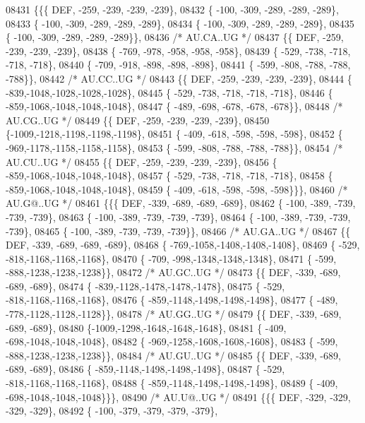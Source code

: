 \begin{DoxyCode}
08431 \{\{\{  DEF, -259, -239, -239, -239\},
08432 \{ -100, -309, -289, -289, -289\},
08433 \{ -100, -309, -289, -289, -289\},
08434 \{ -100, -309, -289, -289, -289\},
08435 \{ -100, -309, -289, -289, -289\}\},
08436 \textcolor{comment}{/* AU.CA..UG */}
08437 \{\{  DEF, -259, -239, -239, -239\},
08438 \{ -769, -978, -958, -958, -958\},
08439 \{ -529, -738, -718, -718, -718\},
08440 \{ -709, -918, -898, -898, -898\},
08441 \{ -599, -808, -788, -788, -788\}\},
08442 \textcolor{comment}{/* AU.CC..UG */}
08443 \{\{  DEF, -259, -239, -239, -239\},
08444 \{ -839,-1048,-1028,-1028,-1028\},
08445 \{ -529, -738, -718, -718, -718\},
08446 \{ -859,-1068,-1048,-1048,-1048\},
08447 \{ -489, -698, -678, -678, -678\}\},
08448 \textcolor{comment}{/* AU.CG..UG */}
08449 \{\{  DEF, -259, -239, -239, -239\},
08450 \{-1009,-1218,-1198,-1198,-1198\},
08451 \{ -409, -618, -598, -598, -598\},
08452 \{ -969,-1178,-1158,-1158,-1158\},
08453 \{ -599, -808, -788, -788, -788\}\},
08454 \textcolor{comment}{/* AU.CU..UG */}
08455 \{\{  DEF, -259, -239, -239, -239\},
08456 \{ -859,-1068,-1048,-1048,-1048\},
08457 \{ -529, -738, -718, -718, -718\},
08458 \{ -859,-1068,-1048,-1048,-1048\},
08459 \{ -409, -618, -598, -598, -598\}\}\},
08460 \textcolor{comment}{/* AU.G@..UG */}
08461 \{\{\{  DEF, -339, -689, -689, -689\},
08462 \{ -100, -389, -739, -739, -739\},
08463 \{ -100, -389, -739, -739, -739\},
08464 \{ -100, -389, -739, -739, -739\},
08465 \{ -100, -389, -739, -739, -739\}\},
08466 \textcolor{comment}{/* AU.GA..UG */}
08467 \{\{  DEF, -339, -689, -689, -689\},
08468 \{ -769,-1058,-1408,-1408,-1408\},
08469 \{ -529, -818,-1168,-1168,-1168\},
08470 \{ -709, -998,-1348,-1348,-1348\},
08471 \{ -599, -888,-1238,-1238,-1238\}\},
08472 \textcolor{comment}{/* AU.GC..UG */}
08473 \{\{  DEF, -339, -689, -689, -689\},
08474 \{ -839,-1128,-1478,-1478,-1478\},
08475 \{ -529, -818,-1168,-1168,-1168\},
08476 \{ -859,-1148,-1498,-1498,-1498\},
08477 \{ -489, -778,-1128,-1128,-1128\}\},
08478 \textcolor{comment}{/* AU.GG..UG */}
08479 \{\{  DEF, -339, -689, -689, -689\},
08480 \{-1009,-1298,-1648,-1648,-1648\},
08481 \{ -409, -698,-1048,-1048,-1048\},
08482 \{ -969,-1258,-1608,-1608,-1608\},
08483 \{ -599, -888,-1238,-1238,-1238\}\},
08484 \textcolor{comment}{/* AU.GU..UG */}
08485 \{\{  DEF, -339, -689, -689, -689\},
08486 \{ -859,-1148,-1498,-1498,-1498\},
08487 \{ -529, -818,-1168,-1168,-1168\},
08488 \{ -859,-1148,-1498,-1498,-1498\},
08489 \{ -409, -698,-1048,-1048,-1048\}\}\},
08490 \textcolor{comment}{/* AU.U@..UG */}
08491 \{\{\{  DEF, -329, -329, -329, -329\},
08492 \{ -100, -379, -379, -379, -379\},

\end{DoxyCode}
